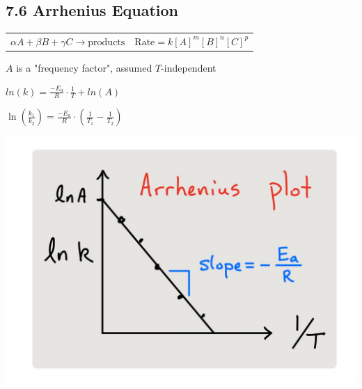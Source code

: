 \subsection{7.6 Arrhenius Equation}
    \vspace*{0.0em}
    \begin{tabular}{c c}
        $\alpha A + \beta B + \gamma C \longrightarrow \text{products}$ & $\text{Rate} = k[A]^m [B]^n [C]^p$
    \end{tabular}


    $A$ is a "frequency factor", assumed $T$-independent
    \vspace*{0.5em}

    \begin{minipage}{0.99\linewidth}
        \begin{minipage}{0.49\linewidth}
            \centerline{$ln(k) = \frac{-E_a}{R} \cdot \frac{1}{T} + ln(A)$}
            \vspace*{0.5em}
            \centerline{$\ln(\frac{k_1}{k_2}) = \frac{-E_a}{R} \cdot \left( \frac{1}{T_1} - \frac{1}{T_2} \right)$}
        \end{minipage}
        \begin{minipage}{0.49\linewidth}
            \centerline{\includegraphics[width=0.8\linewidth]{src/7_Kinetics/images/arrhenius_plot.pdf}}
        \end{minipage}
    \end{minipage}